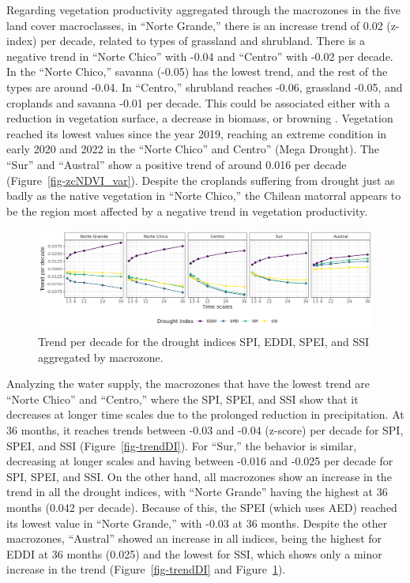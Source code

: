 \documentclass[
  number,
  preprint,
  3p,
  onecolumn]{elsarticle}
\begin{document}
Regarding vegetation productivity aggregated through the macrozones in
the five land cover macroclasses, in ``Norte Grande,'' there is an
increase trend of 0.02 (z-index) per decade, related to types of
grassland and shrubland. There is a negative trend in ``Norte Chico''
with -0.04 and ``Centro'' with -0.02 per decade. In the ``Norte Chico,''
savanna (-0.05) has the lowest trend, and the rest of the types are
around -0.04. In ``Centro,'' shrubland reaches -0.06, grassland -0.05,
and croplands and savanna -0.01 per decade. This could be associated
either with a reduction in vegetation surface, a decrease in biomass, or
browning \citep{Miranda2023}. Vegetation reached its lowest values since
the year 2019, reaching an extreme condition in early 2020 and 2022 in
the ``Norte Chico'' and Centro'' (Mega Drought). The ``Sur'' and
``Austral'' show a positive trend of around 0.016 per decade
(Figure~\ref{fig-zcNDVI_var}). Despite the croplands suffering from
drought just as badly as the native vegetation in ``Norte Chico,'' the
Chilean matorral \citep{Fuentes2021} appears to be the region most
affected by a negative trend in vegetation productivity.

\begin{figure}[!ht]

{\centering \includegraphics{../output/figs/trend_macrozone_drought_indices.png}

}

\caption{\label{fig-trendDIMacro}Trend per decade for the drought
indices SPI, EDDI, SPEI, and SSI aggregated by macrozone.}

\end{figure}

Analyzing the water supply, the macrozones that have the lowest trend
are ``Norte Chico'' and ``Centro,'' where the SPI, SPEI, and SSI show
that it decreases at longer time scales due to the prolonged reduction
in precipitation. At 36 months, it reaches trends between -0.03 and
-0.04 (z-score) per decade for SPI, SPEI, and SSI
(Figure~\ref{fig-trendDI}). For ``Sur,'' the behavior is similar,
decreasing at longer scales and having between -0.016 and -0.025 per
decade for SPI, SPEI, and SSI. On the other hand, all macrozones show an
increase in the trend in all the drought indices, with ``Norte Grande''
having the highest at 36 months (0.042 per decade). Because of this, the
SPEI (which uses AED) reached its lowest value in ``Norte Grande,'' with
-0.03 at 36 months. Despite the other macrozones, ``Austral'' showed an
increase in all indices, being the highest for EDDI at 36 months (0.025)
and the lowest for SSI, which shows only a minor increase in the trend
(Figure~\ref{fig-trendDI} and Figure~\ref{fig-trendDIMacro}).
\end{document}

